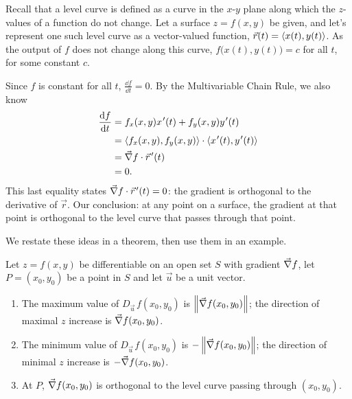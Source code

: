 Recall that a level curve is defined as a curve in the $x$-$y$ plane along which the $z$-values of a function do not change. Let a surface $z=f(x,y)$ be given, and let's represent one such level curve as a vector-valued function, $\vec r(t) =\left\langle x(t), y(t)\right\rangle$. As the output of $f$ does not change along this curve, $f\bigl(x(t),y(t)\bigr) = c$ for all $t$, for some constant $c$.

Since $f$ is constant for all $t$, $\frac{\dd f}{\dd t} = 0$. By the Multivariable Chain Rule, we also know
\begin{align*}
\frac{\dd f}{\dd t} &= f_x(x,y)x\primeskip'(t) + f_y(x,y)y\primeskip'(t)\\
	&=\bracket{f_x(x,y),f_y(x,y)}\cdot\bracket{x\primeskip'(t),y\primeskip'(t)}\\
						&= \grad f \cdot \vrp(t)\\
						&=0.
\end{align*}
This last equality states $\vec\nabla f \cdot \vec r\hskip1.25pt '(t) = 0$: the gradient is orthogonal to the derivative of $\vec r$. Our conclusion: at any point on a surface, the gradient at that point is orthogonal to the level curve that passes through that point.

We restate these ideas in a theorem, then use them in an example.

\begin{theorem}\label{thm:gradient}%
Let $z=f(x,y)$ be differentiable on an open set $S$ with gradient $\vec\nabla f$, let $P=(x_0,y_0)$ be a point in $S$ and let $\vec u$ be a unit vector.
\begin{enumerate}
	\item The maximum value of $D_{\vec u\,}f(x_0,y_0)$ is $\left\lVert \vec\nabla f(x_0,y_0) \right\rVert$; the direction of maximal $z$ increase is $\vec\nabla f(x_0,y_0)$.
	\item   The minimum value of $D_{\vec u\,}f(x_0,y_0)$ is $-\left\lVert \vec\nabla f(x_0,y_0) \right\rVert$; the direction of minimal $z$ increase is $-\vec\nabla f(x_0,y_0)$.
	\item At $P$, $\vec\nabla f(x_0,y_0)$ is orthogonal to the level curve passing through $(x_0,y_0)$.
\end{enumerate}
\end{theorem}

